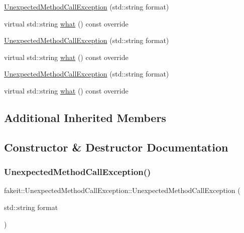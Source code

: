 \begin{DoxyCompactItemize}
\item 
\mbox{\hyperlink{structfakeit_1_1UnexpectedMethodCallException_a9c8737b3fe74c4a9d2cbe151bd05194b}{Unexpected\+Method\+Call\+Exception}} (std\+::string format)
\item 
virtual std\+::string \mbox{\hyperlink{structfakeit_1_1UnexpectedMethodCallException_aabd833b1856e1cf842d2eafc3abf0a0e}{what}} () const override
\item 
\mbox{\hyperlink{structfakeit_1_1UnexpectedMethodCallException_a9c8737b3fe74c4a9d2cbe151bd05194b}{Unexpected\+Method\+Call\+Exception}} (std\+::string format)
\item 
virtual std\+::string \mbox{\hyperlink{structfakeit_1_1UnexpectedMethodCallException_aabd833b1856e1cf842d2eafc3abf0a0e}{what}} () const override
\item 
\mbox{\hyperlink{structfakeit_1_1UnexpectedMethodCallException_a9c8737b3fe74c4a9d2cbe151bd05194b}{Unexpected\+Method\+Call\+Exception}} (std\+::string format)
\item 
virtual std\+::string \mbox{\hyperlink{structfakeit_1_1UnexpectedMethodCallException_aabd833b1856e1cf842d2eafc3abf0a0e}{what}} () const override
\end{DoxyCompactItemize}
\subsection*{Additional Inherited Members}


\subsection{Constructor \& Destructor Documentation}
\mbox{\label{structfakeit_1_1UnexpectedMethodCallException_a9c8737b3fe74c4a9d2cbe151bd05194b}} 
\subsubsection{\texorpdfstring{UnexpectedMethodCallException()}{UnexpectedMethodCallException()}\hspace{0.1cm}{\footnotesize\ttfamily [1/9]}}
{\footnotesize\ttfamily fakeit\+::\+Unexpected\+Method\+Call\+Exception\+::\+Unexpected\+Method\+Call\+Exception (\begin{DoxyParamCaption}\item[{std\+::string}]{format }\end{DoxyParamCaption})\hspace{0.3cm}{\ttfamily [inline]}}


